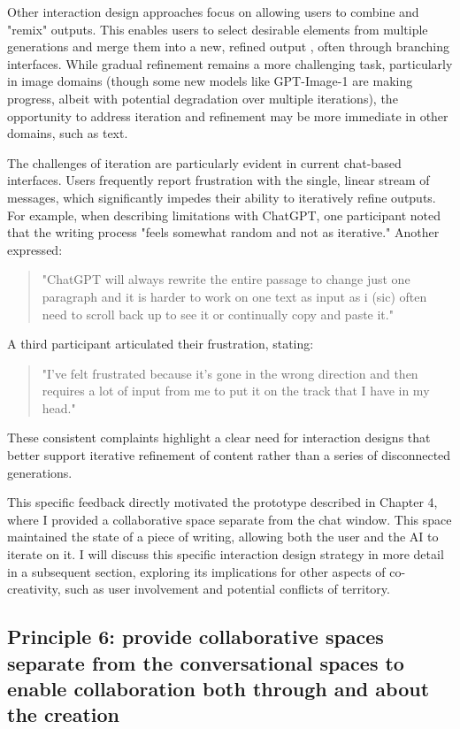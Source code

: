 Other interaction design approaches focus on allowing users to combine and "remix" outputs. This enables users to select desirable elements from multiple generations and merge them into a new, refined output \cite{Zhou2024-vp}, often through branching interfaces. While gradual refinement remains a more challenging task, particularly in image domains (though some new models like GPT-Image-1 are making progress, albeit with potential degradation over multiple iterations), the opportunity to address iteration and refinement may be more immediate in other domains, such as text.

The challenges of iteration are particularly evident in current chat-based interfaces. Users frequently report frustration with the single, linear stream of messages, which significantly impedes their ability to iteratively refine outputs. For example, when describing limitations with ChatGPT, one participant noted that the writing process "feels somewhat random and not as iterative." Another expressed:

\begin{quote}
"ChatGPT will always rewrite the entire passage to change just one paragraph and it is harder to work on one text as input as i (sic) often need to scroll back up to see it or continually copy and paste it."
\end{quote}

A third participant articulated their frustration, stating:

\begin{quote}
"I’ve felt frustrated because it’s gone in the wrong direction and then requires a lot of input from me to put it on the track that I have in my head."
\end{quote}

These consistent complaints highlight a clear need for interaction designs that better support iterative refinement of content rather than a series of disconnected generations. 


This specific feedback directly motivated the prototype described in Chapter 4, where I provided a collaborative space separate from the chat window. This space maintained the state of a piece of writing, allowing both the user and the AI to iterate on it. I will discuss this specific interaction design strategy in more detail in a subsequent section, exploring its implications for other aspects of co-creativity, such as user involvement and potential conflicts of territory.


\subsection{Principle 6: provide collaborative spaces separate from the conversational spaces to enable collaboration both through and about the creation}

